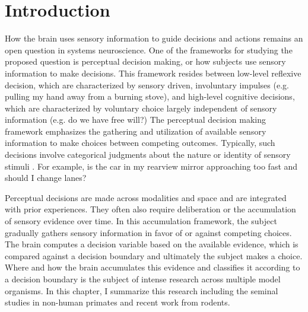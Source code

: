 
\chapter{Introduction} %

\label{Chapter1} %

\newcommand{\keyword}[1]{\textbf{#1}}
\newcommand{\tabhead}[1]{\textbf{#1}}
\newcommand{\code}[1]{\texttt{#1}}
\newcommand{\file}[1]{\texttt{\bfseries#1}}
\newcommand{\option}[1]{\texttt{\itshape#1}}

How the brain uses sensory information to guide decisions and actions remains an open question in systems neuroscience. One of the frameworks for studying the proposed question is perceptual decision making, or how subjects use sensory information to make decisions. This framework resides between low-level reflexive decision, which are characterized by sensory driven, involuntary impulses (e.g. pulling my hand away from a burning stove), and high-level cognitive decisions, which are characterized by voluntary choice largely independent of sensory information (e.g. do we have free will?) The perceptual decision making framework emphasizes the gathering and utilization of available sensory information to make choices between competing outcomes. Typically, such decisions involve categorical judgments about the nature or identity of sensory stimuli \parencite{Ding2013}. For example, is the car in my rearview mirror approaching too fast and should I change lanes? \par 

Perceptual decisions are made across modalities and space and are integrated with prior experiences. They often also require deliberation or the accumulation of sensory evidence over time. In this accumulation framework, the subject gradually gathers sensory information in favor of or against competing choices. The brain computes a decision variable based on the available evidence, which is compared against a decision boundary and ultimately the subject makes a choice. Where and how the brain accumulates this evidence and classifies it according to a decision boundary is the subject of intense research across multiple model organisms. In this chapter, I summarize this research including the seminal studies in non-human primates and recent work from rodents. 


